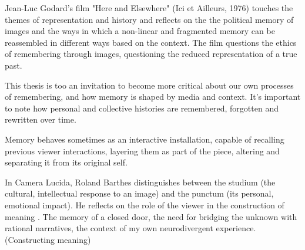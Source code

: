 Jean-Luc Godard's film "Here and Elsewhere" (Ici et Ailleurs, 1976) touches the themes of representation and history and reflects on the the political memory of images and the ways in which a non-linear and fragmented memory can be reassembled in different ways based on the context. The film questions the ethics of remembering through images, questioning the reduced representation of a true past. 

This thesis is too an invitation to become more critical about our own processes of remembering, and how memory is shaped by media and context. It's important to note how personal and collective histories are remembered, forgotten and rewritten over time.

Memory behaves sometimes as an interactive installation, capable of recalling previous viewer interactions, layering them as part of the piece, altering and separating it from its original self. 

In Camera Lucida, Roland Barthes distinguishes between the studium (the cultural, intellectual response to an image) and the punctum (its personal, emotional impact). He reflects on the role of the viewer in the construction of meaning \citep{barthes1993}. The memory of a closed door, the need for bridging the unknown with rational narratives, the context of my own neurodivergent experience. (Constructing meaning)  




